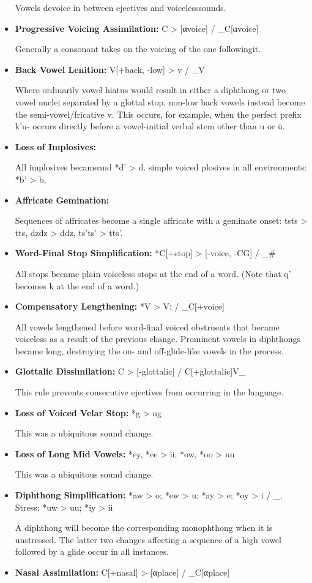 \documentclass[oneside]{book}
\begin{document}
\begin{itemize}
Vowels devoice in between ejectives and voicelesssounds.
\item
\textbf{Progressive Voicing Assimilation:}
C > [αvoice] / \_C[αvoice]

Generally a consonant takes on the voicing of the one followingit.
\item
\textbf{Back Vowel Lenition:}
V[+back, -low] > v / \_V

Where ordinarily vowel hiatus would result in either a diphthong or two vowel nuclei separated by a glottal stop, non-low back vowels instead become the semi-vowel/fricative v.
This occurs, for example, when the perfect prefix k'u- occurs directly before a vowel-initial verbal stem other than u or ü.
\item
\textbf{Loss of Implosives:}

All implosives becameand *d' > d.
simple voiced plosives in all environments: *b' > b,
\item
\textbf{Affricate Gemination:}

Sequences of affricates become a single affricate with a geminate onset: tsts > tts, dzdz > ddz, ts'ts' > tts'.
\item
\textbf{Word-Final Stop Simplification:}
*C[+stop] > [-voice, -CG] / \_\#

All stops became plain voiceless stops at the end of a word.
(Note that q' becomes k at the end of a word.)
\item
\textbf{Compensatory Lengthening:}
*V > Vː / \_C[+voice]

All vowels lengthened before word-final voiced obstruents that became voiceless as a result of the previous change.
Prominent vowels in diphthongs became long, destroying the on- and off-glide-like vowels in the process.
\item
\textbf{Glottalic Dissimilation:}
C > [-glottalic] / C[+glottalic]V\_

This rule prevents consecutive ejectives from occurring in the language.
\item
\textbf{Loss of Voiced Velar Stop:}
*g > ng

This was a ubiquitous sound change.
\item
\textbf{Loss of Long Mid Vowels:}
*ey, *ee > ii; *ow, *oo > uu

This was a ubiquitous sound change.
\item
\textbf{Diphthong Simplification:}
*aw > o; *ew > u; *ay > e; *oy > i / \_, Stress; *uw > uu; *iy > ii

A diphthong will become the corresponding monophthong when it is unstressed.
The latter two changes affecting a sequence of a high vowel followed by a glide occur in all instances.
\item
\textbf{Nasal Assimilation:}
C[+nasal] > [αplace] / \_C[αplace]


\end{itemize}
\end{document}
